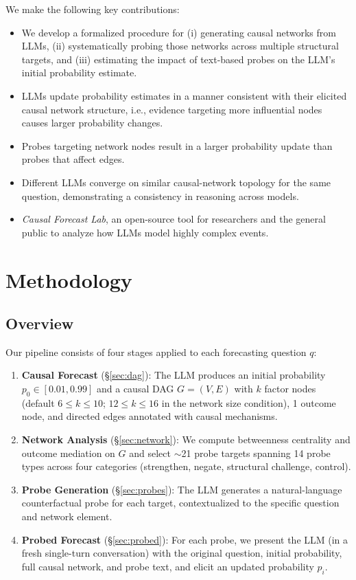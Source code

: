 \documentclass[11pt]{article}
\begin{document}
We make the following key contributions:
\begin{itemize}
    \item We develop a formalized procedure for (i) generating causal networks from LLMs, (ii) systematically probing those networks across multiple structural targets, and (iii) estimating the impact of text-based probes on the LLM's initial probability estimate.
    \item LLMs update probability estimates in a manner consistent with their elicited causal network structure, i.e., evidence targeting more influential nodes causes larger probability changes.
    \item Probes targeting network nodes result in a larger probability update than probes that affect edges.
    \item Different LLMs converge on similar causal-network topology for the same question, demonstrating a consistency in reasoning across models.
    \item \emph{Causal Forecast Lab}, an open-source tool for researchers and the general public to analyze how LLMs model highly complex events.
\end{itemize}

\section{Methodology}
\label{sec:method}

\subsection{Overview}

Our pipeline consists of four stages applied to each forecasting question $q$:

\begin{enumerate}
    \item \textbf{Causal Forecast} (\S\ref{sec:dag}): The LLM produces an initial probability $p_0 \in [0.01, 0.99]$ and a causal DAG $G = (V, E)$ with $k$ factor nodes (default $6 \leq k \leq 10$; $12 \leq k \leq 16$ in the network size condition), 1 outcome node, and directed edges annotated with causal mechanisms.
    \item \textbf{Network Analysis} (\S\ref{sec:network}): We compute betweenness centrality and outcome mediation on $G$ and select ${\sim}$21 probe targets spanning 14 probe types across four categories (strengthen, negate, structural challenge, control).
    \item \textbf{Probe Generation} (\S\ref{sec:probes}): The LLM generates a natural-language counterfactual probe for each target, contextualized to the specific question and network element.
    \item \textbf{Probed Forecast} (\S\ref{sec:probed}): For each probe, we present the LLM (in a fresh single-turn conversation) with the original question, initial probability, full causal network, and probe text, and elicit an updated probability $p_i$.
\end{enumerate}
\end{document}
